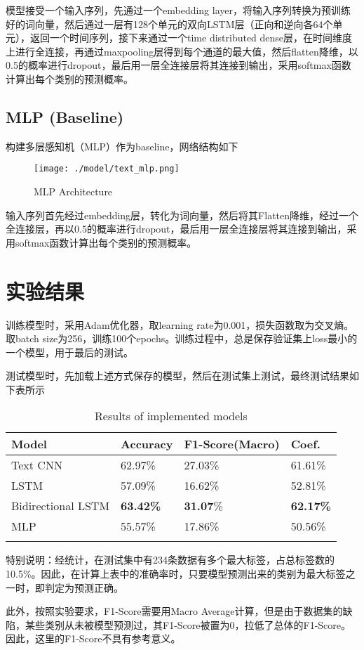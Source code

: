 \documentclass[12pt,a4paper]{article}
\begin{document}
模型接受一个输入序列，先通过一个embedding layer，将输入序列转换为预训练好的词向量，然后通过一层有128个单元的双向LSTM层（正向和逆向各64个单元），返回一个时间序列，接下来通过一个time distributed dense层，在时间维度上进行全连接，再通过maxpooling层得到每个通道的最大值，然后flatten降维，以0.5的概率进行dropout，最后用一层全连接层将其连接到输出，采用softmax函数计算出每个类别的预测概率。

\subsection{MLP (Baseline)}

构建多层感知机（MLP）作为baseline，网络结构如下

\begin{figure}[H]
\centering
\texttt{[image: ./model/text\_mlp.png]}
\caption{MLP Architecture}
\end{figure}

输入序列首先经过embedding层，转化为词向量，然后将其Flatten降维，经过一个全连接层，再以0.5的概率进行dropout，最后用一层全连接层将其连接到输出，采用softmax函数计算出每个类别的预测概率。

\section{实验结果}

训练模型时，采用Adam优化器，取learning rate为0.001，损失函数取为交叉熵。取batch size为256，训练100个epochs。训练过程中，总是保存验证集上loss最小的一个模型，用于最后的测试。

测试模型时，先加载上述方式保存的模型，然后在测试集上测试，最终测试结果如下表所示

\begin{longtable}[H]{llll}
\toprule
Model & Accuracy & F1-Score(Macro) & Coef.\tabularnewline
\midrule
\endhead
Text CNN & 62.97\% & 27.03\% & 61.61\%\tabularnewline
LSTM & 57.09\% & 16.62\% & 52.81\%\tabularnewline
Bidirectional LSTM & \textbf{63.42\%} & \textbf{31.07}\% & \textbf{62.17\%}\tabularnewline
MLP & 55.57\% & 17.86\% & 50.56\%\tabularnewline
\bottomrule
\caption{Results of implemented models}
\end{longtable}

特别说明：经统计，在测试集中有234条数据有多个最大标签，占总标签数的10.5\%。因此，在计算上表中的准确率时，只要模型预测出来的类别为最大标签之一时，即判定为预测正确。

此外，按照实验要求，F1-Score需要用Macro Average计算，但是由于数据集的缺陷，某些类别从未被模型预测过，其F1-Score被置为0，拉低了总体的F1-Score。因此，这里的F1-Score不具有参考意义。
\end{document}
